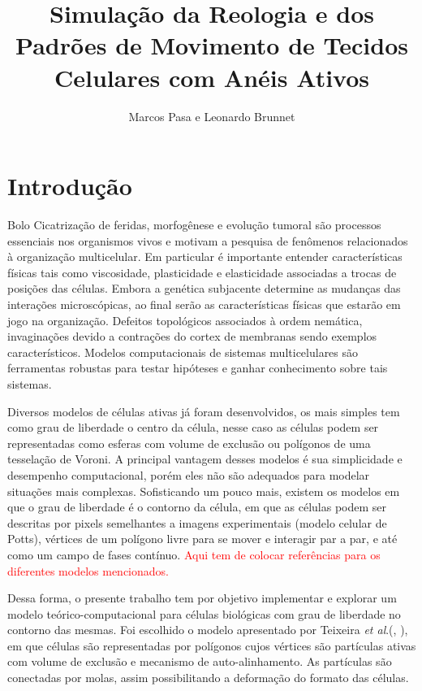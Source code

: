 \documentclass{article}
\title{Simulação da Reologia e dos Padrões de Movimento de Tecidos Celulares com Anéis Ativos}
\author{Marcos Pasa e Leonardo Brunnet}
\theoremstyle{definition}
\begin{document}
\maketitle

\section{Introdução}
Bolo Cicatrização de feridas, morfogênese e evolução tumoral são processos essenciais nos organismos vivos e motivam a pesquisa de fenômenos relacionados à organização multicelular. Em particular é importante entender características físicas tais como viscosidade, plasticidade e elasticidade associadas a trocas de posições das células. Embora a genética subjacente determine as mudanças das interações microscópicas, ao final serão as características físicas que estarão em jogo na organização. Defeitos topológicos associados à ordem nemática, invaginações devido a contrações do cortex de membranas sendo  exemplos característicos. Modelos computacionais de sistemas multicelulares são ferramentas robustas para testar hipóteses e ganhar conhecimento sobre tais sistemas.

Diversos modelos de células ativas já foram desenvolvidos, os mais simples tem como grau de liberdade o centro da célula, nesse caso as células podem ser representadas como esferas com volume de exclusão ou polígonos de uma tesselação de Voroni. A principal vantagem desses modelos é sua simplicidade e desempenho computacional, porém eles não são adequados para modelar situações mais complexas. Sofisticando um pouco mais, existem os modelos em que o grau de liberdade é o contorno da célula, em que as células podem ser descritas por pixels semelhantes a imagens experimentais (modelo celular de Potts), vértices de um polígono livre para se mover e interagir par a par, e até como um campo de fases contínuo.
\textcolor{red}{Aqui tem de colocar referências para os diferentes modelos mencionados.}

Dessa forma, o presente trabalho tem por objetivo implementar e explorar um modelo teórico-computacional para células biológicas com grau de liberdade no contorno das mesmas. Foi escolhido o modelo apresentado por Teixeira \textit{et al}.(\cite{teixeira_single_2021}, \cite{teixeira_segregation_2024}), em que células são representadas por polígonos cujos vértices são partículas ativas com volume de exclusão e mecanismo de auto-alinhamento. As partículas são conectadas por molas, assim possibilitando a deformação do formato das células.
\end{document}
